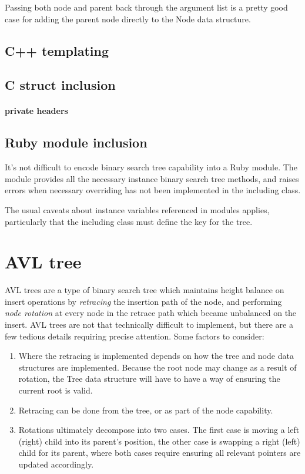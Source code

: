 \documentclass{article}
\begin{document}
Passing both node and parent back through the argument list is a pretty good
case for adding the parent node directly to the Node data structure.


\subsection{C++ templating}

\subsection{C struct inclusion}

\paragraph{private headers}

\subsection{Ruby module inclusion}

It's not difficult to encode binary search tree capability into a Ruby module.
The module provides all the necessary instance binary search tree methods, and
raises errors when necessary overriding has not been implemented in the
including class.

The usual caveats about instance variables referenced in modules applies,
particularly that the including class must define the key for the tree.

\section{AVL tree}

AVL trees are a type of binary search tree which maintains height balance
on insert operations by \textit{retracing} the insertion path of the node,
and performing \textit{node rotation} at every node in the retrace path
which became unbalanced on the insert. AVL trees are not that technically
difficult to implement, but there are a few tedious details requiring
precise attention. Some factors to consider:

\begin{enumerate}
  \item Where the retracing is implemented depends on how the tree and
    node data structures are implemented. Because the root node may change
    as a result of rotation, the Tree data structure will have to have a way
    of ensuring the current root is valid.
  \item Retracing can be done from the tree, or as part of the node capability.
  \item Rotations ultimately decompose into two cases. The first case is moving
    a left (right) child into its parent's position, the other case is swapping a right (left)
    child for its parent, where both cases require ensuring all relevant pointers
    are updated accordingly.
\end{enumerate}
\end{document}

